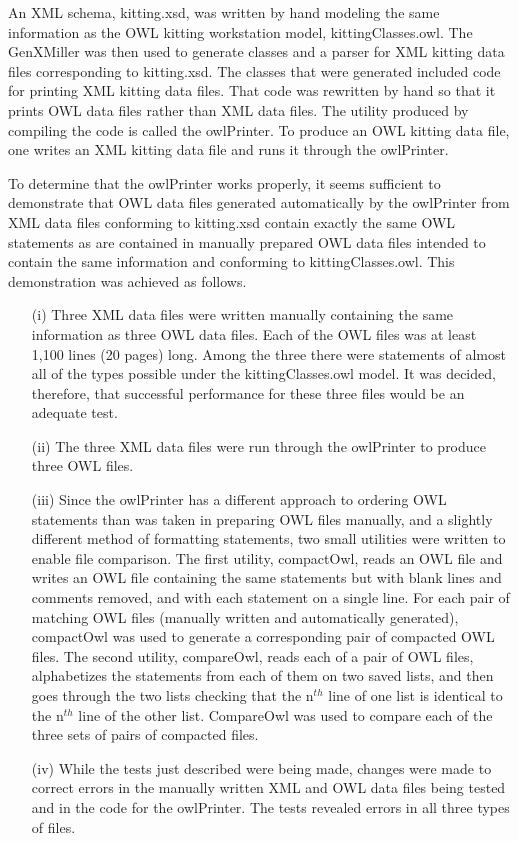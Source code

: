 An XML schema, kitting.xsd, was written by hand modeling the same
information as the OWL kitting workstation model, kittingClasses.owl. The
GenXMiller was then used to generate {\cpp} classes and a parser for XML
kitting data files corresponding to kitting.xsd. The {\cpp} classes that were
generated included code for printing XML kitting data
files. That code was rewritten by hand so that it prints OWL data files
rather than XML data files. The utility produced by compiling the code is
called the owlPrinter. To produce an OWL kitting data file, one writes an
XML kitting data file and runs it through the owlPrinter.

To determine that the owlPrinter works properly, it seems sufficient to
demonstrate that OWL data files generated automatically by the owlPrinter
from XML data files conforming to kitting.xsd contain exactly the same OWL
statements as are contained in manually prepared OWL data files intended to
contain the same information and conforming to kittingClasses.owl. This
demonstration was achieved as follows.

\begin{enumerate}
\item[ (i) ] Three XML data files were written manually containing the same
  information as three OWL data files. Each of the OWL files was at least
  1,100 lines (20 pages) long. Among the three there were statements of
  almost all of the types possible under the kittingClasses.owl model. It was
  decided, therefore, that successful performance for these three files
  would be an adequate test.
\item[ (ii) ] The three XML data files were run through the owlPrinter to produce
  three OWL files.
\item[ (iii) ] Since the owlPrinter has a different approach to ordering OWL
  statements than was taken in preparing OWL files manually, and a slightly
  different method of formatting statements, two small utilities were
  written to enable file comparison. The first utility, compactOwl, reads
  an OWL file and writes an OWL file containing the same statements but
  with blank lines and comments removed, and with each statement on a
  single line. For each pair of matching OWL files (manually written and
  automatically generated), compactOwl was used to generate a corresponding
  pair of compacted OWL files. The second utility, compareOwl, reads each
  of a pair of OWL files, alphabetizes the statements from each of them on
  two saved lists, and then goes through the two lists checking that the
  n$^{th}$ line of one list is identical to the n$^{th}$ line of the other list.
  CompareOwl was used to compare each of the three sets of pairs of
  compacted files.
\item[ (iv) ] While the tests just described were being made, changes were made to
  correct errors in the manually written XML and OWL data files being
  tested and in the code for the owlPrinter. The tests revealed errors in
  all three types of files.
\end{enumerate}

